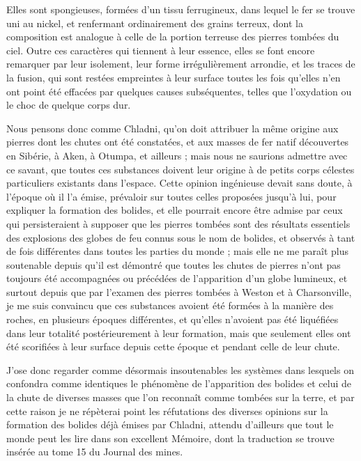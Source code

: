 \documentclass[a4paper, 12pt, oneside, french]{article}
\begin{document}
Elles sont spongieuses, formées d'un tissu ferrugineux, dans lequel le fer se trouve uni au nickel, et renfermant ordinairement des grains terreux, dont la composition est analogue à celle de la portion terreuse des pierres tombées du ciel. Outre ces caractères qui tiennent à leur essence, elles se font encore remarquer par leur isolement, leur forme irrégulièrement arrondie, et les traces de la fusion, qui sont restées empreintes à leur surface toutes les fois qu'elles n'en ont point été effacées par quelques causes subséquentes, telles que l'oxydation ou le choc de quelque corps dur.

Nous pensons donc comme Chladni, qu'on doit attribuer la même origine aux pierres dont les chutes ont été constatées, et aux masses de fer natif découvertes en Sibérie, à Aken, à Otumpa, et ailleurs ; mais nous ne saurions admettre avec ce savant, que toutes ces substances doivent leur origine à de petits corps célestes particuliers existants dans l'espace. Cette opinion ingénieuse devait sans doute, à l'époque où il l'a émise, prévaloir sur toutes celles proposées jusqu'à lui, pour expliquer la formation des bolides, et elle pourrait encore être admise par ceux qui persisteraient à supposer que les pierres tombées sont des résultats essentiels des explosions des globes de feu connus sous le nom de bolides, et observés à tant de fois différentes dans toutes les parties du monde ; mais elle ne me paraît plus soutenable depuis qu'il est démontré que toutes les chutes de pierres n'ont pas toujours été accompagnées ou précédées de l'apparition d'un globe lumineux, et surtout depuis que par l'examen des pierres tombées à Weston et à Charsonville, je me suis convaincu que ces substances avoient été formées à la manière des roches, en plusieurs époques différentes, et qu'elles n'avoient pas été liquéfiées dans leur totalité postérieurement à leur formation, mais que seulement elles ont été scorifiées à leur surface depuis cette époque et pendant celle de leur chute.

J'ose donc regarder comme désormais insoutenables les systèmes dans lesquels on confondra comme identiques le phénomène de l'apparition des bolides et celui de la chute de diverses masses que l'on reconnaît comme tombées sur la terre, et par cette raison je ne répèterai point les réfutations des diverses opinions sur la formation des bolides déjà émises par Chladni, attendu d'ailleurs que tout le monde peut les lire dans son excellent Mémoire, dont la traduction se trouve insérée au tome 15 du Journal des mines.
\end{document}
